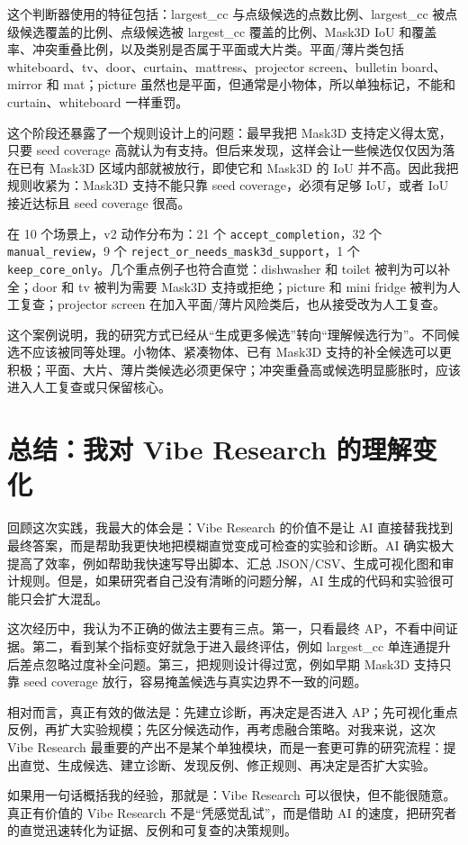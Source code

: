 \documentclass[UTF8,a4paper,12pt]{ctexart}
\begin{document}
这个判断器使用的特征包括：largest\_cc 与点级候选的点数比例、largest\_cc 被点级候选覆盖的比例、点级候选被 largest\_cc 覆盖的比例、Mask3D IoU 和覆盖率、冲突重叠比例，以及类别是否属于平面或大片类。平面/薄片类包括 whiteboard、tv、door、curtain、mattress、projector screen、bulletin board、mirror 和 mat；picture 虽然也是平面，但通常是小物体，所以单独标记，不能和 curtain、whiteboard 一样重罚。

这个阶段还暴露了一个规则设计上的问题：最早我把 Mask3D 支持定义得太宽，只要 seed coverage 高就认为有支持。但后来发现，这样会让一些候选仅仅因为落在已有 Mask3D 区域内部就被放行，即使它和 Mask3D 的 IoU 并不高。因此我把规则收紧为：Mask3D 支持不能只靠 seed coverage，必须有足够 IoU，或者 IoU 接近达标且 seed coverage 很高。

在 10 个场景上，v2 动作分布为：21 个 \texttt{accept\_completion}，32 个 \texttt{manual\_review}，9 个 \texttt{reject\_or\_needs\_mask3d\_support}，1 个 \texttt{keep\_core\_only}。几个重点例子也符合直觉：dishwasher 和 toilet 被判为可以补全；door 和 tv 被判为需要 Mask3D 支持或拒绝；picture 和 mini fridge 被判为人工复查；projector screen 在加入平面/薄片风险类后，也从接受改为人工复查。

这个案例说明，我的研究方式已经从“生成更多候选”转向“理解候选行为”。不同候选不应该被同等处理。小物体、紧凑物体、已有 Mask3D 支持的补全候选可以更积极；平面、大片、薄片类候选必须更保守；冲突重叠高或候选明显膨胀时，应该进入人工复查或只保留核心。

\section{总结：我对 Vibe Research 的理解变化}

回顾这次实践，我最大的体会是：Vibe Research 的价值不是让 AI 直接替我找到最终答案，而是帮助我更快地把模糊直觉变成可检查的实验和诊断。AI 确实极大提高了效率，例如帮助我快速写导出脚本、汇总 JSON/CSV、生成可视化图和审计规则。但是，如果研究者自己没有清晰的问题分解，AI 生成的代码和实验很可能只会扩大混乱。

这次经历中，我认为不正确的做法主要有三点。第一，只看最终 AP，不看中间证据。第二，看到某个指标变好就急于进入最终评估，例如 largest\_cc 单连通提升后差点忽略过度补全问题。第三，把规则设计得过宽，例如早期 Mask3D 支持只靠 seed coverage 放行，容易掩盖候选与真实边界不一致的问题。

相对而言，真正有效的做法是：先建立诊断，再决定是否进入 AP；先可视化重点反例，再扩大实验规模；先区分候选动作，再考虑融合策略。对我来说，这次 Vibe Research 最重要的产出不是某个单独模块，而是一套更可靠的研究流程：提出直觉、生成候选、建立诊断、发现反例、修正规则、再决定是否扩大实验。

如果用一句话概括我的经验，那就是：Vibe Research 可以很快，但不能很随意。真正有价值的 Vibe Research 不是“凭感觉乱试”，而是借助 AI 的速度，把研究者的直觉迅速转化为证据、反例和可复查的决策规则。
\end{document}
